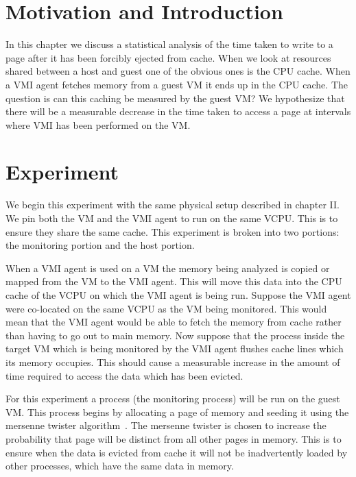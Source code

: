 
\section{Motivation and Introduction}
In this chapter we discuss a statistical analysis of the time taken to write to a page after it has been forcibly ejected from cache. When we look at resources shared between a host and guest one of the obvious ones is the CPU cache.  When a VMI agent fetches memory from a guest VM it ends up in the CPU cache. The question is can this caching be measured by the guest VM?  We hypothesize that there will be a measurable decrease in the time taken to access a page at intervals where VMI has been performed on the VM. 


\section{Experiment}

We begin this experiment with the same physical setup described in chapter II.  We pin both the VM and the VMI agent to run on the same VCPU.  This is to ensure they share the same cache. This experiment is broken into two portions: the monitoring portion and the host portion. 

When a VMI agent is used on a VM the memory being analyzed is copied or mapped from the VM to the VMI agent. This will move this data into the CPU cache of the VCPU on which the VMI agent is being run. Suppose the VMI agent were co-located on the same VCPU as the VM being monitored. This would mean that the VMI agent would be able to fetch the memory from cache rather than having to go out to main memory. Now suppose that the process inside the target VM which is being monitored by the VMI agent flushes cache lines which its memory occupies. This should cause a measurable increase in the amount of time required to access the data which has been evicted. 

For this experiment a process (the monitoring process) will be run on the guest VM. This process begins by allocating a page of memory and seeding it using the mersenne twister  algorithm~\cite{matsumoto_mersenne_1998}. The mersenne twister is chosen to increase the probability that page will be distinct from all other pages in memory. This is to ensure when the data is evicted from cache it will not be inadvertently loaded by other processes, which have the same data in memory. 

